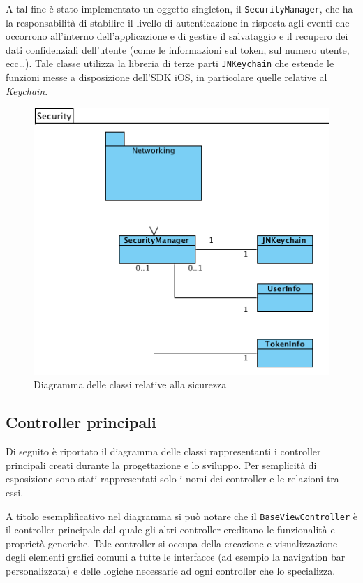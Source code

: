 A tal fine è stato implementato un oggetto singleton, il \texttt{SecurityManager}, che ha la responsabilità di stabilire il livello di autenticazione in risposta agli eventi che occorrono all'interno dell'applicazione e di gestire il salvataggio e il recupero dei dati confidenziali dell'utente (come le informazioni sul token, sul numero utente, ecc\dots). Tale classe utilizza la libreria di terze parti \texttt{JNKeychain} che estende le funzioni messe a disposizione dell'SDK iOS, in particolare quelle relative al \emph{Keychain}. 

\begin{figure}[!htbp]
\centering
\includegraphics[scale=0.70]{architettura/securityClass.png}
\caption{Diagramma delle classi relative alla sicurezza}
\end{figure}
\newpage
\subsection{Controller principali}
Di seguito è riportato il diagramma delle classi rappresentanti i controller principali creati durante la progettazione e lo sviluppo. Per semplicità di esposizione sono stati rappresentati solo i nomi dei controller e le relazioni tra essi.
\newline

A titolo esemplificativo nel diagramma si può notare che il \texttt{BaseViewController} è il controller principale dal quale gli altri controller ereditano le funzionalità e proprietà generiche. Tale controller si occupa della creazione e visualizzazione degli  elementi grafici comuni a tutte le interfacce (ad esempio la navigation bar personalizzata) e delle logiche necessarie ad ogni controller che lo specializza.


